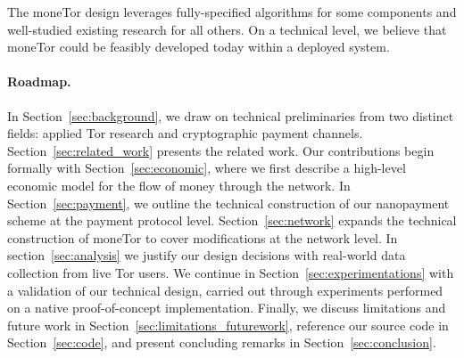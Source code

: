 The moneTor design leverages fully-specified algorithms for some components and
well-studied existing research for all others. On a technical level, we believe
that moneTor could be feasibly developed today within a deployed system.

\paragraph*{Roadmap.} In Section~\ref{sec:background}, we draw on technical
preliminaries from two distinct fields: applied Tor research and cryptographic
payment channels. Section~\ref{sec:related_work} presents the related work. Our
contributions begin formally with Section~\ref{sec:economic}, where we first
describe a high-level economic model for the flow of money through the
network. In Section~\ref{sec:payment}, we outline the technical construction of
our nanopayment scheme at the payment protocol level. Section~\ref{sec:network}
expands the technical construction of moneTor to cover modifications at the
network level. In section~\ref{sec:analysis} we justify our design decisions
with real-world data collection from live Tor users. We continue in
Section~\ref{sec:experimentations} with a validation of our technical design,
carried out through experiments performed on a native proof-of-concept
implementation. Finally, we discuss limitations and future work in
Section~\ref{sec:limitations_futurework}, reference our source code in
Section~\ref{sec:code}, and present concluding remarks in
Section~\ref{sec:conclusion}.

